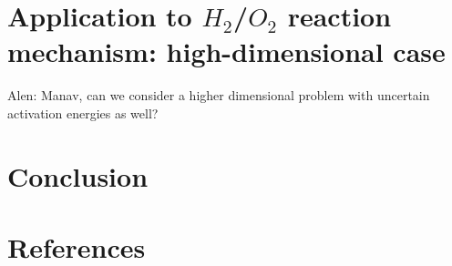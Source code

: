\documentclass[11pt]{article}
\newcommand{\alennote}[1]{{\color{blue} Alen: {#1}}}
\begin{document}
\section{Application to $H_2$/$O_2$ reaction mechanism: high-dimensional case}

\alennote{Manav, can we consider a higher dimensional problem with uncertain
activation energies as well?}

\section{Conclusion}

\section*{References}


\end{document}
